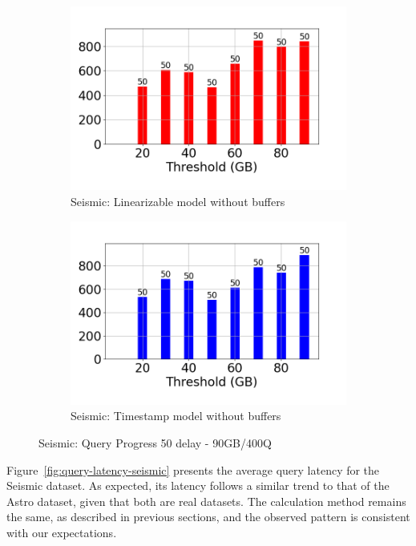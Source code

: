 \begin{figure}
\begin{subfigure}[c]{0.48\textwidth}
		\includegraphics[width=1\textwidth]	 {figures/Experiments/Dynamic/SEISMIC/50/average_query_time_per_batch_version_999777016_10485760_10_delay[50].png}
		\caption{Seismic: Linearizable model without buffers}
		\label{fig:logical-ts-no-50-seismic}
	\end{subfigure}
	\begin{subfigure}[c]{0.48\textwidth}
		\includegraphics[width=1\textwidth]	 {figures/Experiments/Dynamic/SEISMIC/50/average_query_time_per_batch_version_999777017_10485760_10_delay[50].png}
		\caption{Seismic: Timestamp model without buffers}
		\label{fig:system-ts-no-50-seismic}
	\end{subfigure}
	\caption{Seismic: Query Progress 50 delay - 90GB/400Q}
	\label{fig:query-progress-50-seismic}
\end{figure}

%
Figure~\ref{fig:query-latency-seismic} presents the average query latency for the Seismic
dataset. As expected, its latency follows a similar trend to that of the Astro dataset,
given that both are real datasets. The calculation method remains the same, as described in
previous sections, and the observed pattern is consistent with our expectations.

